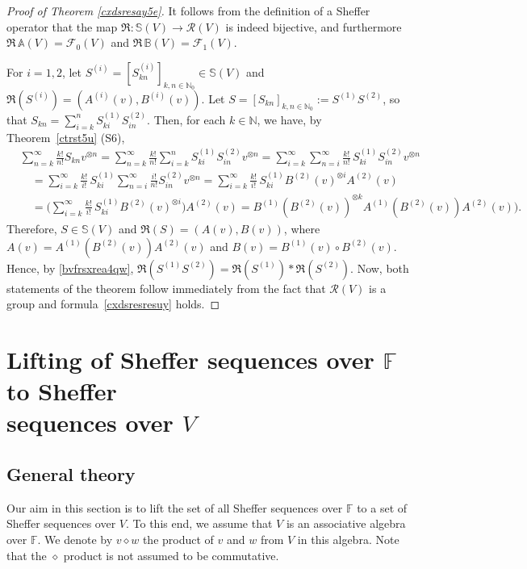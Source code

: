 \documentclass[12pt]{article}
\theoremstyle{remark}
\theoremstyle{remark}
\theoremstyle{remark}
\begin{document}
\begin{proof}[Proof of Theorem \ref{cxdsresay5e}] It follows from the definition of a Sheffer operator that the map  $\mathfrak R:\mathbb S(V) \to \mathcal R(V)$ is indeed bijective, and furthermore $\mathfrak R\,\mathbb A(V)=\mathcal F_0(V)$ and $\mathfrak R\,\mathbb B(V)=\mathcal F_1(V)$. 

For $i=1,2$, let $S^{(i)}=[S_{kn}^{(i)}]_{k,n\in\mathbb N_0}\in \mathbb S(V)$ and $\mathfrak R(S^{(i)})=(A^{(i)}(v),B^{(i)}(v))$. Let $S=[S_{kn}]_{k,n\in\mathbb N_0}:=S^{(1)}S^{(2)}$, so that 
$S_{kn}=\sum_{i=k}^nS_{ki}^{(1)}S_{in}^{(2)}$. Then, for each $k\in \mathbb N$, we have, by Theorem~\ref{ctrst5u} (S6),
\begin{align*}
&\sum_{n=k}^\infty \frac{k!}{n!}S_{kn}v^{\otimes n}=\sum_{n=k}^\infty \frac{k!}{n!}\sum_{i=k}^nS_{ki}^{(1)}S_{in}^{(2)}v^{\otimes n}=\sum_{i=k}^\infty \sum_{n=i}^\infty\frac{k!}{n!}\,S_{ki}^{(1)}S_{in}^{(2)}v^{\otimes n}\\
&\quad=\sum_{i=k}^\infty \frac{k!}{i!}\,S_{ki}^{(1)}\sum_{n=i}^\infty \frac{i!}{n!}S_{in}^{(2)}v^{\otimes n}=\sum_{i=k}^\infty \frac{k!}{i!}\,S_{ki}^{(1)}B^{(2)}(v)^{\otimes i}A^{(2)}(v)\\
&\quad =\bigg(\sum_{i=k}^\infty \frac{k!}{i!}\,S_{ki}^{(1)}B^{(2)}(v)^{\otimes i}\bigg)A^{(2)}(v)=B^{(1)}(B^{(2)}(v))^{\otimes k}A^{(1)}(B^{(2)}(v))A^{(2)}(v)).\end{align*}
Therefore, $S\in\mathbb S(V)$ and $\mathfrak R(S)=(A(v),B(v))$, where
$A(v)=A^{(1)}(B^{(2)}(v))A^{(2)}(v)$ and $B(v)=B^{(1)}(v)\circ B^{(2)}(v)$. Hence, by \eqref{bvfrsxrea4qw}, $\mathfrak R(S^{(1)}S^{(2)})=\mathfrak R(S^{(1)})\ast\mathfrak R(S^{(2)})$. 
 Now, both statements of the theorem follow immediately from the fact that $\mathcal R(V)$ is a group and formula~\eqref{cxdsresresuy} holds.
\end{proof}


\section{Lifting of Sheffer sequences over $\mathbb F$  to Sheffer\\ sequences over $V$}\label{gxzrfsarh}

\subsection{General theory}\label{87ygfc5rddf65}
 
 Our aim in this section is to lift the set of all Sheffer sequences over $\mathbb F$ to a set of Sheffer sequences over $V$. To this end, we assume that $V$ is an associative algebra over $\mathbb F$. We denote by $v\diamond w$ the product of $v$ and $w$ from $V$ in this algebra. Note that the $\diamond$ product is not assumed to be commutative.  
\end{document}
